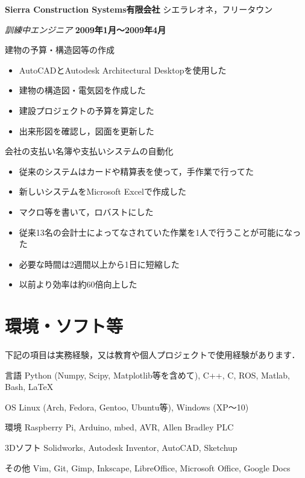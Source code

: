 \documentclass[10pt, a4paper]{article}
\def\xeCJKembold{0.15}
\def\saveCJKnode{\dimen255\lastkern}
\def\restoreCJKnode{\kern-\dimen255\kern\dimen255}
\let\CJKoldsymbol\CJKsymbol
\let\CJKoldpunctsymbol\CJKpunctsymbol
\def\CJKfakeboldsymbol#1{%
\special{pdf:literal direct 2 Tr \xeCJKembold\space w}%
\CJKoldsymbol{#1}%
\saveCJKnode
\special{pdf:literal direct 0 Tr}%
\restoreCJKnode}
\def\CJKfakeboldpunctsymbol#1{%
\special{pdf:literal direct 2 Tr \xeCJKembold\space w}%
\CJKoldpunctsymbol{#1}%
\saveCJKnode
\special{pdf:literal direct 0 Tr}%
\restoreCJKnode}
\newcommand\CJKfakebold[1]{%
\let\CJKsymbol\CJKfakeboldsymbol
\let\CJKpunctsymbol\CJKfakeboldpunctsymbol
#1%
\let\CJKsymbol\CJKoldsymbol
\let\CJKpunctsymbol\CJKoldpunctsymbol}
\begin{document}
\halfblankline

\CJKfakebold{\textbf{Sierra Construction Systems有限会社}}\hfill シエラレオネ，フリータウン

\begin{outerlist}
\item[] \textit{訓練中エンジニア} \hfill \textbf{2009年1月〜2009年4月}
  \begin{innerlist}
  \item 建物の予算・構造図等の作成
    \begin{itemize}
      \item AutoCADとAutodesk Architectural Desktopを使用した
      \item 建物の構造図・電気図を作成した
      \item 建設プロジェクトの予算を算定した
      \item 出来形図を確認し，図面を更新した
    \end{itemize}
  \item 会社の支払い名簿や支払いシステムの自動化
    \begin{itemize}
      \item 従来のシステムはカードや精算表を使って，手作業で行ってた
      \item 新しいシステムをMicrosoft Excelで作成した
      \item マクロ等を書いて，ロバストにした
      \item 従来13名の会計士によってなされていた作業を1人で行うことが可能になった
      \item 必要な時間は2週間以上から1日に短縮した
      \item 以前より効率は約60倍向上した
    \end{itemize}
  \end{innerlist}
\end{outerlist}

\section{環境・ソフト等}
下記の項目は実務経験，又は教育や個人プロジェクトで使用経験があります．
\begin{outerlist}
\item[言語] Python (Numpy, Scipy, Matplotlib等を含めて), C++, C, ROS, Matlab, Bash, \LaTeX
\item[OS] Linux (Arch, Fedora, Gentoo, Ubuntu等), Windows (XP〜10)
\item[環境] Raspberry Pi, Arduino, mbed, AVR, Allen Bradley PLC
\item[3Dソフト] Solidworks, Autodesk Inventor, AutoCAD, Sketchup
\item[その他] Vim, Git, Gimp, Inkscape, LibreOffice, Microsoft Office, Google Docs
\end{outerlist}
\end{document}
